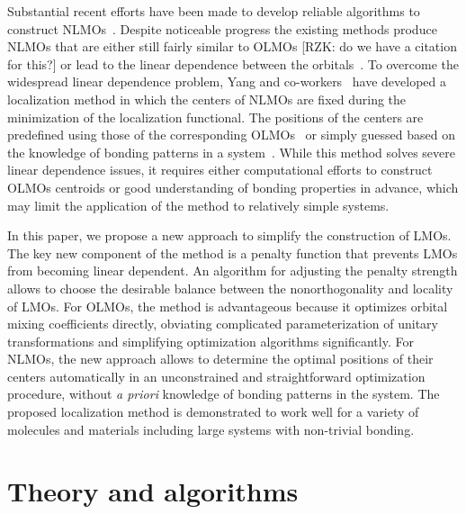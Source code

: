 \documentclass[aps,prl,reprint,amsmath,amssymb]{revtex4-1}
\begin{document}
Substantial recent efforts have been made to develop reliable algorithms to construct NLMOs~\cite{feng2004An_efficient, liu2000nonorthogonal, peng2013effective, hoyvik2017generalising}. %
%
Despite noticeable progress the existing methods produce NLMOs that are either still fairly similar to OLMOs 
[RZK: do we have a citation for this?] 
or lead to the linear dependence between the orbitals~\cite{feng2004An_efficient}. 
To overcome the widespread linear dependence problem, Yang and co-workers~\cite{feng2004An_efficient, cui2010efficient} have developed a localization method in which the centers of NLMOs are fixed during the minimization of the localization functional. 
The positions of the centers are predefined using those of the corresponding OLMOs~\cite{feng2004An_efficient} or simply guessed based on the knowledge of bonding patterns in a system~\cite{cui2010efficient}. %
While this method solves severe linear dependence issues, it requires either computational efforts to construct OLMOs centroids or good understanding of bonding properties in advance, which may limit the application of the method to relatively simple systems.

In this paper, we propose a new approach to simplify the construction of LMOs. 
The key new component of the method is a penalty function that prevents LMOs from becoming linear dependent.  
An algorithm for adjusting the penalty strength allows to choose the desirable balance between the nonorthogonality and locality of LMOs. 
For OLMOs, the method is advantageous because it optimizes orbital mixing coefficients directly, obviating complicated parameterization of unitary transformations and simplifying optimization algorithms significantly.  
For NLMOs, the new approach allows to determine the optimal positions of their centers automatically in an unconstrained and straightforward optimization procedure, without \emph{a priori} knowledge of bonding patterns in the system.
The proposed localization method is demonstrated to work well for a variety of molecules and materials including large systems with non-trivial bonding. 

\section{Theory and algorithms}
\end{document}
